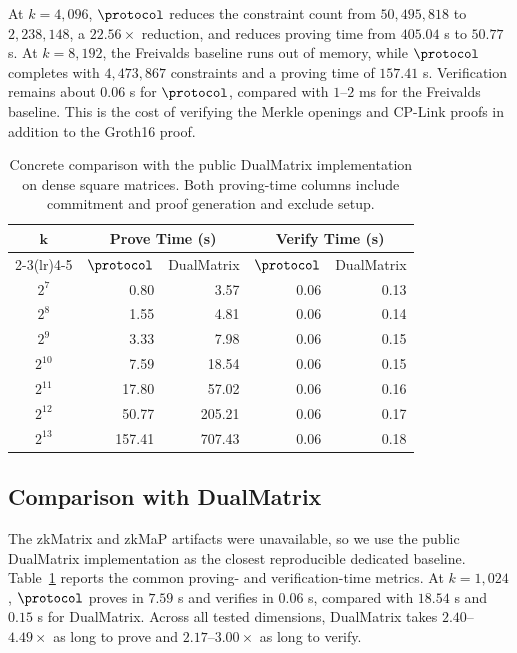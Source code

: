At \(k=4{,}096\), \(\protocol\) reduces the constraint count from
\(50{,}495{,}818\) to \(2{,}238{,}148\), a \(22.56\times\) reduction, and
reduces proving time from \(405.04\) s to \(50.77\) s.  At \(k=8{,}192\), the
Freivalds baseline runs out of memory, while \(\protocol\) completes with
\(4{,}473{,}867\) constraints and a proving time of \(157.41\) s.
Verification remains about \(0.06\) s for \(\protocol\), compared with
\(1\)--\(2\) ms for the Freivalds baseline.  This is the cost of verifying the
Merkle openings and CP-Link proofs in addition to the Groth16 proof.

\begin{table}[!t]
\centering
\footnotesize
\setlength{\tabcolsep}{4pt}
\begin{tabular}{c rr rr}
\toprule
\multirow{2}{*}{\(\boldsymbol{k}\)}
& \multicolumn{2}{c}{\textbf{Prove Time (s)}}
& \multicolumn{2}{c}{\textbf{Verify Time (s)}} \\
\cmidrule(lr){2-3}\cmidrule(lr){4-5}
& \(\protocol\) & DualMatrix & \(\protocol\) & DualMatrix \\
\midrule
$2^7$    & 0.80   & 3.57   & 0.06 & 0.13 \\
$2^8$    & 1.55   & 4.81   & 0.06 & 0.14 \\
$2^9$    & 3.33   & 7.98   & 0.06 & 0.15 \\
$2^{10}$ & 7.59   & 18.54  & 0.06 & 0.15 \\
$2^{11}$ & 17.80  & 57.02  & 0.06 & 0.16 \\
$2^{12}$ & 50.77  & 205.21 & 0.06 & 0.17 \\
$2^{13}$ & 157.41 & 707.43 & 0.06 & 0.18 \\
\bottomrule
\end{tabular}
\vspace{4pt}
\caption{Concrete comparison with the public DualMatrix implementation on
dense square matrices.  Both proving-time columns include commitment and proof
generation and exclude setup.}
\label{tab:lamp-vs-dualmatrix}
\end{table}

\subsection{Comparison with DualMatrix}
The zkMatrix and zkMaP artifacts were unavailable, so we use the public
DualMatrix implementation as the closest reproducible dedicated baseline.
Table~\ref{tab:lamp-vs-dualmatrix} reports the common proving- and
verification-time metrics.  At \(k=1{,}024\), \(\protocol\) proves in
\(7.59\) s and verifies in \(0.06\) s, compared with \(18.54\) s and
\(0.15\) s for DualMatrix.  Across all tested dimensions, DualMatrix takes
\(2.40\)--\(4.49\times\) as long to prove and \(2.17\)--\(3.00\times\) as
long to verify.

